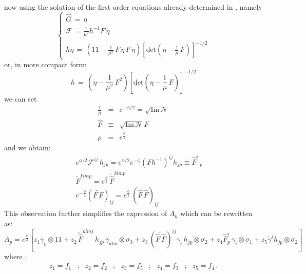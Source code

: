 \documentclass[a4paper,11pt]{article}
\def\tilde{\widetilde}
\begin{document}
now using the solution of the first order equations already
determined in \cite{noidued3}, namely
\begin{equation}
 \left\{ \begin{array}{ccc}
 \widehat{G} \, = \, \eta \\
 \mathcal{F} \, = \frac{1}{\mu^{2}} h^{-1} F \, \eta \\
 h \eta \, = \, ( 1 \! \!  1 - \frac{1}{\mu^{2}} \, F \, \eta \, F \, \eta)
 \left[ \mbox{det} \left( \eta - \frac{1}{\mu} \, F \right) \right] ^{-1/2}
 \end{array}\right.
\label{sistem3}
\end{equation}
or, in more compact form:
\begin{equation}
h  \, = \, ( \eta  - \frac{1}{\mu^{2}} \, F^{2} )
\left[ \mbox{det} \left( \eta - \frac{1}{\mu} \, F \right) \right] ^{-1/2}
\label{h no eta}
\end{equation}
we can set
\begin{eqnarray}
 \frac{1}{\mu} & = & e^{-\phi/2} = \sqrt{\mbox{Im} \,
 \mathcal{N}}\nonumber\\
 \hat{F}  & \equiv & \sqrt{\mbox{Im} \,
 \mathcal{N}} F \nonumber \\
 \rho & = & e^{\frac{\phi}{2}}
\label{muchoi}
\end{eqnarray}
and we obtain:
\begin{eqnarray}
&& e^{\phi /2} \mathcal{F}^{ij} \, h_{jp} =
e^{\phi /2} e^{ - \phi}(Fh^{-1})^{ij} h_{jp} \equiv \hat{F}^{i} \, _{p} \nonumber \\
&& {\tilde F}^{klmp} = e^{\frac{\phi}{2}} \, {\tilde {\hat F}}^{klmp} \nonumber \\
&& e^{-\frac{\phi}{2}}({\tilde {F \, F}})_{ij} = e^{\frac{\phi}{2}} \, ({\tilde {\hat{F} \, \hat{F}}})_{ij}
\label{pi pi tilda}
\end{eqnarray}
This observation further simplifies the expression of $A_{k}$ which can be rewritten as:
\begin{equation}
A_{p} \! = \!e^{\frac{\phi}{2}}[z_{1} \gamma_{p} \otimes 1 \! \! 1 + z_{2} \, \tilde{\hat{F}}^{klmj} \, h_{jp} \, \gamma_{klm} \otimes \sigma_{3} + z_3 \, ({\tilde{\hat{F} \, \hat{F}}})^{ij} \gamma_i \, h_{jp} \otimes \sigma_2 + z_4 \hat{F}^{i}_{p} \, \gamma_i \otimes \sigma_1 + z_5 {\tilde \gamma}^{j} h_{jp} \otimes \sigma_2]
\label{concis2 Ak}
\end{equation}
where :
\begin{equation}
\begin{array}{rclcrclcrclcrclcrcl}
z_1 = f_{1} &;& z_2 = f_{2} &;& z_3 = f_5 &;& z_4 = f_3 &;& z_5 = f_4
\, .
\end{array}
\label{gli z}
\end{equation}
\end{document}
